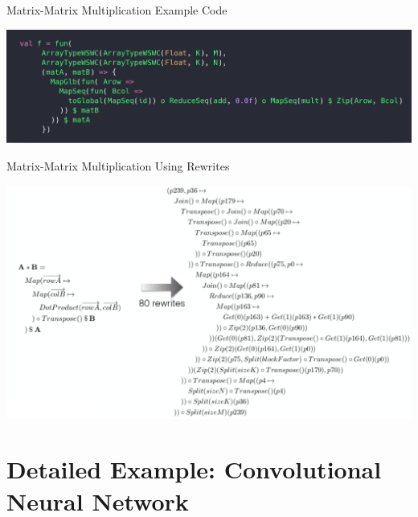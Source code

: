 \documentclass[10pt]{beamer}
\begin{document}
\begin{frame}{Matrix-Matrix Multiplication Example Code}
        \begin{block}{}
        \begin{center}
            \includegraphics[width=\textwidth]{../images/matrixMatrix.png}
        \end{center}
        \end{block}
\end{frame}

\begin{frame}{Matrix-Matrix Multiplication Using Rewrites}
        \begin{block}{}
        \begin{center}
            \includegraphics[width=\textwidth]{../images/matrixRewrites.pdf}
        \end{center}
        \end{block}
\end{frame}


\section{Detailed Example: Convolutional Neural Network }
\end{document}
